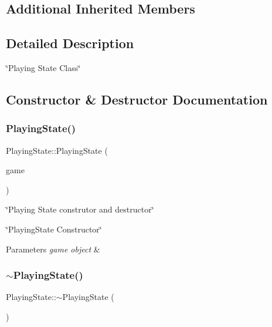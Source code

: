 \subsection*{Additional Inherited Members}


\subsection{Detailed Description}
\char`\"{}\+Playing State Class\char`\"{} 

\subsection{Constructor \& Destructor Documentation}
\mbox{\label{classPlayingState_a0f58bcb8372adf9e533ce09451a24a1f}} 
\subsubsection{\texorpdfstring{Playing\+State()}{PlayingState()}}
{\footnotesize\ttfamily Playing\+State\+::\+Playing\+State (\begin{DoxyParamCaption}\item[{\hyperlink{classGame}{Game} $\ast$}]{game }\end{DoxyParamCaption})}



\char`\"{}\+Playing State construtor and destructor\char`\"{} 

\char`\"{}\+Playing\+State Constructor\char`\"{}


\begin{DoxyParams}{Parameters}
{\em game object} & \\
\hline
\end{DoxyParams}
\mbox{\label{classPlayingState_afd96eb2be532e40c9db2f9607e4ea284}} 
\subsubsection{\texorpdfstring{$\sim$\+Playing\+State()}{~PlayingState()}}
{\footnotesize\ttfamily Playing\+State\+::$\sim$\+Playing\+State (\begin{DoxyParamCaption}{ }\end{DoxyParamCaption})}




